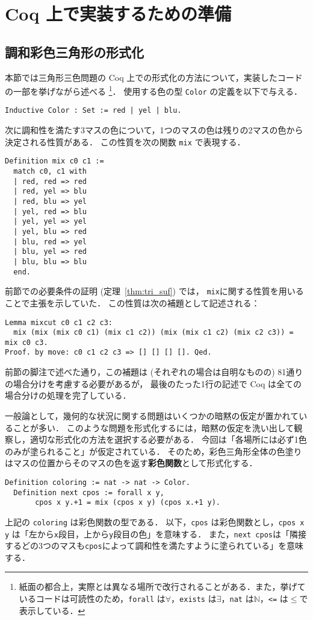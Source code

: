 \section{Coq 上で実装するための準備}
\subsection{調和彩色三角形の形式化}
本節では三角形三色問題の Coq 上での形式化の方法について，実装したコードの一部を挙げながら述べる
\footnote{紙面の都合上，実際とは異なる場所で改行されることがある．また，挙げているコードは可読性のため，{\tt forall} は$\forall$，{\tt exists} は$\exists$，{\tt nat} は$\mathbb{N}$，{\tt <=} は$\leq$で表示している．}．
使用する色の型 {\tt Color} の定義を以下で与える．
\begin{lstlisting}[language=Coq]
  Inductive Color : Set := red | yel | blu.
\end{lstlisting}

次に調和性を満たす3マスの色について，1つのマスの色は残りの2マスの色から決定される性質がある．
この性質を次の関数 {\tt mix} で表現する．
\begin{lstlisting}[language=Coq]
  Definition mix c0 c1 :=
  match c0, c1 with
  | red, red => red
  | red, yel => blu
  | red, blu => yel
  | yel, red => blu
  | yel, yel => yel
  | yel, blu => red
  | blu, red => yel
  | blu, yel => red
  | blu, blu => blu
  end.
\end{lstlisting}

前節での必要条件の証明 (定理~\ref{thm:tri_suf}) では，
{\tt mix}に関する性質を用いることで主張を示していた．
この性質は次の補題として記述される：
\begin{lstlisting}[language=Coq]
  Lemma mixcut c0 c1 c2 c3:
  mix (mix (mix c0 c1) (mix c1 c2)) (mix (mix c1 c2) (mix c2 c3)) = mix c0 c3.
Proof. by move: c0 c1 c2 c3 => [] [] [] []. Qed.
\end{lstlisting}
前節の脚注で述べた通り，この補題は (それぞれの場合は自明なものの) 81通りの場合分けを考慮する必要があるが，
最後のたった1行の記述で Coq は全ての場合分けの処理を完了している．

一般論として，幾何的な状況に関する問題はいくつかの暗黙の仮定が置かれていることが多い．
このような問題を形式化するには，暗黙の仮定を洗い出して観察し，適切な形式化の方法を選択する必要がある．
今回は「各場所には必ず1色のみが塗られること」が仮定されている．
そのため，彩色三角形全体の色塗りはマスの位置からそのマスの色を返す{\bf 彩色関数}として形式化する．
\begin{lstlisting}[language=Coq]
  Definition coloring := nat -> nat -> Color.
  Definition next cpos := forall x y,
       cpos x y.+1 = mix (cpos x y) (cpos x.+1 y).
\end{lstlisting}
上記の {\tt coloring} は彩色関数の型である．
以下，{\tt cpos} は彩色関数とし，{\tt cpos x y} は「左から{\tt x}段目，上から{\tt y}段目の色」を意味する．
また，{\tt next cpos}は「隣接するどの3つのマスも{\tt cpos}によって調和性を満たすように塗られている」を意味する．

